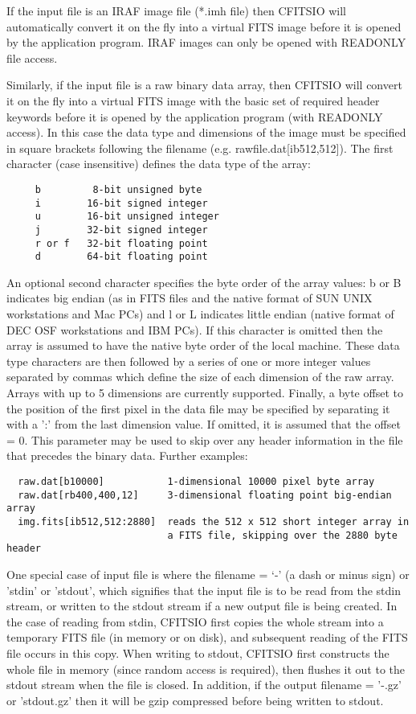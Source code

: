 \documentclass[11pt]{book}
\begin{document}
If the input file is an IRAF image file (*.imh file) then CFITSIO will
automatically convert it on the fly into a virtual FITS image before it
is opened by the application program.  IRAF images can only be opened
with READONLY file access.

Similarly, if the input file is a raw binary data array, then CFITSIO
will convert it on the fly into a virtual FITS image with the basic set
of required header keywords before it is opened by the application
program (with READONLY access).  In this case the data type and
dimensions of the image must be specified in square brackets following
the filename (e.g. rawfile.dat[ib512,512]). The first character (case
insensitive) defines the data type of the array:

\begin{verbatim}
     b         8-bit unsigned byte
     i        16-bit signed integer
     u        16-bit unsigned integer
     j        32-bit signed integer
     r or f   32-bit floating point
     d        64-bit floating point
\end{verbatim}
An optional second character specifies the byte order of the array
values: b or B indicates big endian (as in FITS files and the native
format of SUN UNIX workstations and Mac PCs) and l or L indicates
little endian (native format of DEC OSF workstations and IBM PCs).  If
this character is omitted then the array is assumed to have the native
byte order of the local machine.  These data type characters are then
followed by a series of one or more integer values separated by commas
which define the size of each dimension of the raw array.  Arrays with
up to 5 dimensions are currently supported.  Finally, a byte offset to
the position of the first pixel in the data file may be specified by
separating it with a ':' from the last dimension value.  If omitted, it
is assumed that the offset = 0.  This parameter may be used to skip
over any header information in the file that precedes the binary data.
Further examples:

\begin{verbatim}
  raw.dat[b10000]           1-dimensional 10000 pixel byte array
  raw.dat[rb400,400,12]     3-dimensional floating point big-endian array
  img.fits[ib512,512:2880]  reads the 512 x 512 short integer array in
                            a FITS file, skipping over the 2880 byte header
\end{verbatim}

One special case of input file is where the filename = `-' (a dash or
minus sign) or 'stdin' or 'stdout', which signifies that the input file
is to be read from the stdin stream, or written to the stdout stream if
a new output file is being created.  In the case of reading from stdin,
CFITSIO first copies the whole stream into a temporary FITS file (in
memory or on disk), and subsequent reading of the FITS file occurs in
this copy.  When writing to stdout, CFITSIO first constructs the whole
file in memory (since random access is required), then flushes it out
to the stdout stream when the file is closed.  In addition, if the
output filename = '-.gz' or 'stdout.gz' then it will be gzip compressed
before being written to stdout.
\end{document}
